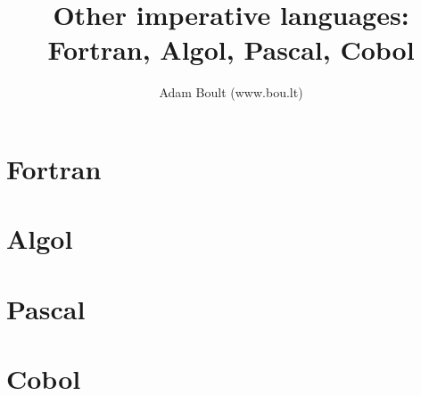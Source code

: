 \documentclass[oneside]{book}
\begin{document}
\author{Adam Boult (www.bou.lt)}
\title{Other imperative languages: Fortran, Algol, Pascal, Cobol}
\maketitle

\setcounter{tocdepth}{0}
\tableofcontents



\part{Fortran}


\part{Algol}


\part{Pascal}


\part{Cobol}

\end{document}
